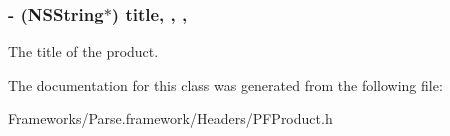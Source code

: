 \subsubsection[{title}]{\setlength{\rightskip}{0pt plus 5cm}-\/ (N\+S\+String$\ast$) title\hspace{0.3cm}{\ttfamily [read]}, {\ttfamily [write]}, {\ttfamily [nonatomic]}, {\ttfamily [strong]}}\label{interface_p_f_product_aca711bfd74798b7d0563d5ff5719c6d9}
The title of the product. 

The documentation for this class was generated from the following file\+:\begin{DoxyCompactItemize}
\item 
Frameworks/\+Parse.\+framework/\+Headers/P\+F\+Product.\+h\end{DoxyCompactItemize}
